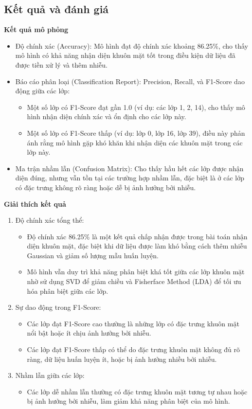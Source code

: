 \documentclass[a4paper,12pt]{extarticle}
\begin{document}
\subsection{Kết quả và đánh giá}
{\large \textbf{Kết quả mô phỏng}}
\begin{itemize}
    \item Độ chính xác (Accuracy): Mô hình đạt độ chính xác khoảng 86.25\%, cho thấy mô hình có khả năng nhận diện khuôn mặt tốt trong điều kiện dữ liệu đã được tiền xử lý và thêm nhiễu.
    \item Báo cáo phân loại (Classification Report): Precision, Recall, và F1-Score dao động giữa các lớp:
    \begin{itemize}
        \item Một số lớp có F1-Score đạt gần 1.0 (ví dụ: các lớp 1, 2, 14), cho thấy mô hình nhận diện chính xác và ổn định cho các lớp này.
        \item  Một số lớp có F1-Score thấp (ví dụ: lớp 0, lớp 16, lớp 39), điều này phản ánh rằng mô hình gặp khó khăn khi nhận diện các khuôn mặt trong các lớp này.
    \end{itemize}
    \item Ma trận nhầm lẫn (Confusion Matrix): Cho thấy hầu hết các lớp được nhận diện đúng, nhưng vẫn tồn tại các trường hợp nhầm lẫn, đặc biệt là ở các lớp có đặc trưng không rõ ràng hoặc dễ bị ảnh hưởng bởi nhiễu.
\end{itemize}
{\large \textbf{Giải thích kết quả}}
\begin{enumerate}
    \item Độ chính xác tổng thể:
    \begin{itemize}
        \item Độ chính xác 86.25\% là một kết quả chấp nhận được trong bài toán nhận diện khuôn mặt, đặc biệt khi dữ liệu được làm khó bằng cách thêm nhiễu Gaussian và giảm số lượng mẫu huấn luyện.
        \item  Mô hình vẫn duy trì khả năng phân biệt khá tốt giữa các lớp khuôn mặt nhờ sử dụng SVD để giảm chiều và Fisherface Method (LDA) để tối ưu hóa phân biệt giữa các lớp.
    \end{itemize}
    \item Sự dao động trong F1-Score:
    \begin{itemize}
        \item Các lớp đạt F1-Score cao thường là những lớp có đặc trưng khuôn mặt nổi bật hoặc ít chịu ảnh hưởng bởi nhiễu.
        \item Các lớp đạt F1-Score thấp có thể do đặc trưng khuôn mặt không đủ rõ ràng, dữ liệu huấn luyện ít, hoặc bị ảnh hưởng nhiều bởi nhiễu.
    \end{itemize}
    \item Nhầm lẫn giữa các lớp:
    \begin{itemize}
        \item Các lớp dễ nhầm lẫn thường có đặc trưng khuôn mặt tương tự nhau hoặc bị ảnh hưởng bởi nhiễu, làm giảm khả năng phân biệt của mô hình.
    \end{itemize}
\end{enumerate}
\end{document}
